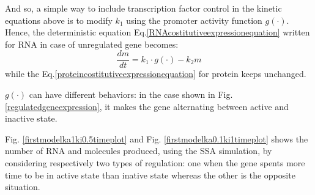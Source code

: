 \documentclass[12pt,a4paper]{report}
\begin{document}
And so, a simple way to include transcription factor control in the kinetic equations above is to modify $k_{1}$ using the promoter activity function $g( \cdot )$. Hence, the deterministic equation Eq.\ref{RNAcostitutiveexpressionequation} written for RNA in case of unregulated gene becomes:
\begin{equation}\label{regulatedgeneequation}
 \frac{dm}{dt} = k_{1} \cdot g(\cdot) - k_{2}m
\end{equation}
while the Eq.\ref{proteincostitutiveexpressionequation} for protein keeps unchanged.

$g( \cdot )$ can have different behaviors: in the case shown in Fig. \ref{regulatedgeneexpression}, it makes the gene alternating between active and inactive state.

Fig. \ref{firstmodelka1ki0.5timeplot} and Fig. \ref{firstmodelka0.1ki1timeplot} shows the number of RNA and molecules produced, using the SSA simulation, by considering respectively two types of regulation: one when the gene spents more time to be in active state than inative state whereas the other is the opposite situation.
\end{document}
